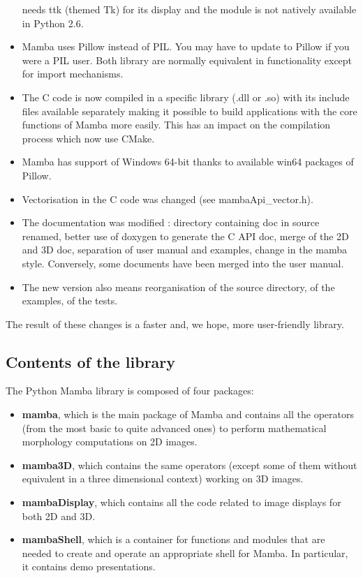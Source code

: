 \documentclass[a4paper,10pt,oneside]{article}
\begin{document}
\begin{itemize}
needs ttk (themed Tk) for its display and the module is not natively available
in Python 2.6.
\item Mamba uses Pillow instead of PIL. You may have to update to Pillow if
you were a PIL user. Both library are normally equivalent in functionality
except for import mechanisms.
\item The C code is now compiled in a specific library (.dll or .so) with
its include files available separately making it possible to build applications
with the core functions of Mamba more easily. This has an impact on the
compilation process which now use CMake.
\item Mamba has support of Windows 64-bit thanks to available win64 packages
of Pillow.
\item Vectorisation in the C code was changed (see mambaApi\_vector.h).
\item The documentation was modified : directory containing doc in source renamed,
better use of doxygen to generate the C API doc, merge of the 2D and 3D doc,
separation of user manual and examples, change in the mamba style. Conversely,
some documents have been merged into the user manual.
\item The new version also means reorganisation of the source directory, of the
examples, of the tests.
\end{itemize}

The result of these changes is a faster and, we hope, more user-friendly
library.

\subsection{Contents of the library}

The Python Mamba library is composed of four packages:
\begin{itemize}
\item \textbf{mamba}, which is the main package of Mamba and contains all the operators
(from the most basic to quite advanced ones) to perform mathematical morphology
computations on 2D images.
\item  \textbf{mamba3D}, which contains the same operators (except some of them without
equivalent in a three dimensional context) working on 3D images.
\item  \textbf{mambaDisplay}, which contains all the code related to image displays for
both 2D and 3D.
\item  \textbf{mambaShell}, which is a container for functions and modules that are
needed to create and operate an appropriate shell for Mamba. In particular, it
contains demo presentations.
\end{itemize}
\end{document}
